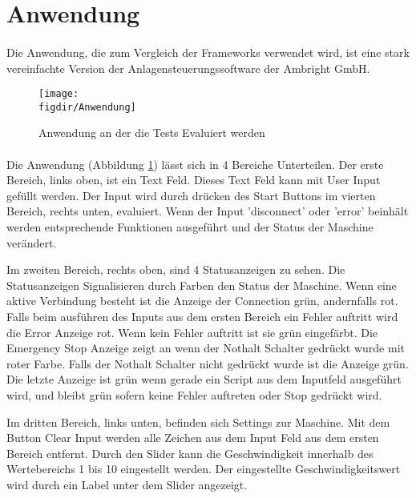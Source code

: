 		\newpage
	\section{Anwendung}
		\paragraph{} Die Anwendung, die zum Vergleich der Frameworks verwendet wird, ist eine stark vereinfachte Version der Anlagensteuerungssoftware der Ambright GmbH.  
		
		\FloatBarrier
		\begin{figure}[t]		
			\centering
			\texttt{[image: \\figdir/Anwendung]}
				
			\caption[Anwendung]
			{Anwendung an der die Tests Evaluiert werden}
			\label{FIG:Anwendung}
		\end{figure}
		\FloatBarrier
		
		\paragraph{} Die Anwendung (Abbildung \ref{FIG:Anwendung}) lässt sich in 4 Bereiche Unterteilen. Der erste Bereich, links oben, ist ein Text Feld. Dieses Text Feld kann mit User Input gefüllt werden. Der Input wird durch drücken des Start Buttons im vierten Bereich, rechts unten, evaluiert. Wenn der Input 'disconnect' oder 'error' beinhält werden entsprechende Funktionen ausgeführt und der Status der Maschine verändert.  
		
		Im zweiten Bereich, rechts oben, sind 4 Statusanzeigen zu sehen. Die Statusanzeigen Signalisieren durch Farben den Status der Maschine. Wenn eine aktive Verbindung besteht ist die Anzeige der Connection grün, andernfalls rot. 
		Falls beim ausführen des Inputs aus dem ersten Bereich ein Fehler auftritt wird die Error Anzeige rot. Wenn kein Fehler auftritt ist sie grün eingefärbt. 
		Die Emergency Stop Anzeige zeigt an wenn der Nothalt Schalter gedrückt wurde mit roter Farbe. Falls der Nothalt Schalter nicht gedrückt wurde ist die Anzeige grün. 
		Die letzte Anzeige ist grün wenn gerade ein Script aus dem Inputfeld ausgeführt wird, und bleibt grün sofern keine Fehler auftreten oder Stop gedrückt wird.
		
		Im dritten Bereich, links unten, befinden sich Settings zur Maschine. Mit dem Button Clear Input werden alle Zeichen aus dem  Input Feld aus dem ersten Bereich entfernt. Durch den Slider kann die Geschwindigkeit innerhalb des Wertebereichs 1 bis 10 eingestellt werden. Der eingestellte Geschwindigkeitswert wird durch ein Label unter dem Slider angezeigt.
		
